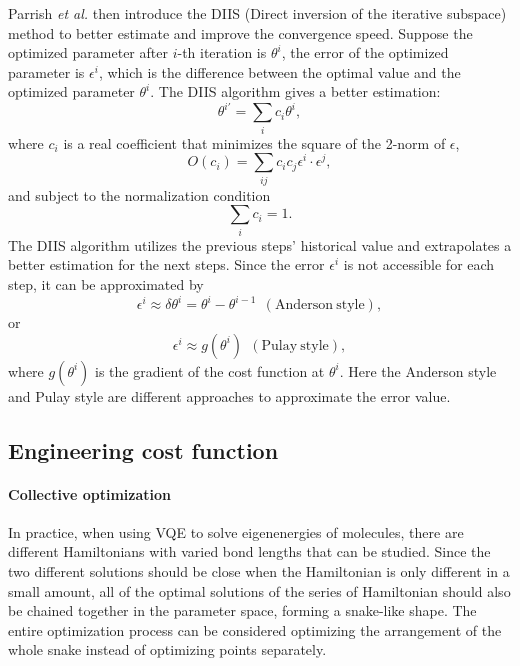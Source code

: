 Parrish \textit{et al.} \cite{parrish_jacobi_2019} then introduce the DIIS (Direct inversion of the iterative subspace) method to better estimate and improve the convergence speed. Suppose the optimized parameter after $i$-th iteration is $\theta^i$, the error of the optimized parameter is $\epsilon^i$, which is the difference between the optimal value and the optimized parameter $\theta^i$. The DIIS algorithm gives a better estimation:
\begin{equation}
    \theta^{i\prime} = \sum_i c_i\theta^i,
\end{equation}
where $c_i$ is a real coefficient that minimizes the square of the 2-norm of $\epsilon$,
\begin{equation}
    O(c_i) = \sum_{ij}c_ic_j\epsilon^i \cdot \epsilon^j,
\end{equation}
and subject to the normalization condition 
\begin{equation}
   \sum_i c_i = 1.
\end{equation}
The DIIS algorithm utilizes the previous steps' historical value and extrapolates a better estimation for the next steps. Since the error $\epsilon^i$ is not accessible for each step, it can be approximated by 
\begin{equation}
    \epsilon^i \approx \delta \theta^i = \theta^i - \theta^{i-1} ~~\mathrm{(Anderson~style)},
\end{equation}
or 
\begin{equation}
    \epsilon^i \approx g(\theta^i) ~~\mathrm{(Pulay~style)},
\end{equation}
where $g(\theta^i)$ is the gradient of the cost function at $\theta^i$. Here the Anderson style and Pulay style are different approaches to approximate the error value.

\subsection{Engineering cost function} \label{sec:cost_function}

\paragraph{Collective optimization}\cite{zhang_collective_2020}
In practice, when using VQE to solve eigenenergies of molecules, there are different Hamiltonians with varied bond lengths that can be studied. Since the two different solutions should be close when the Hamiltonian is only different in a small amount, all of the optimal solutions of the series of Hamiltonian should also be chained together in the parameter space, forming a snake-like shape. The entire optimization process can be considered optimizing the arrangement of the whole snake instead of optimizing points separately. 

